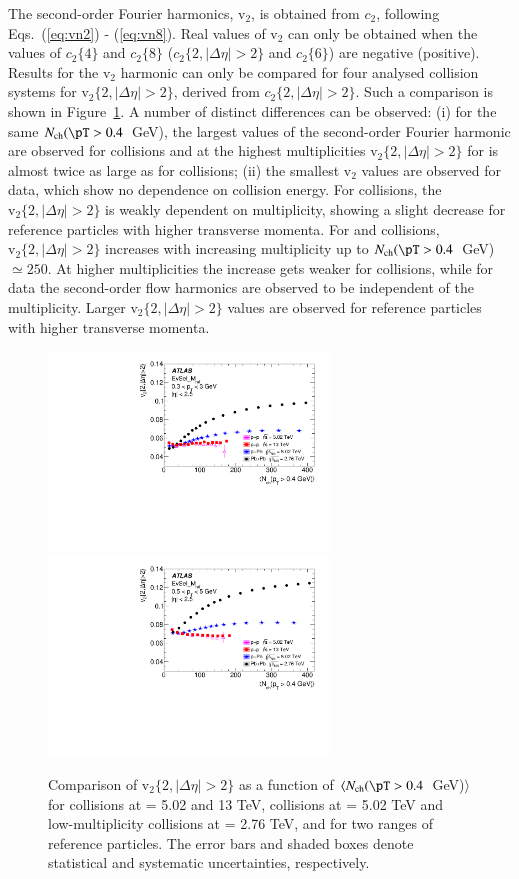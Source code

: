 \documentclass[cernpreprint,texlive=2014,txfonts,UKenglish]{latex/atlasdoc}
\renewcommand{\eqref}[1]{\textup{{\normalfont(\ref{#1}}\normalfont)}}
\begin{document}
The second-order Fourier harmonics, $\mathrm{v}_2$, is obtained from $c_2$, following Eqs.~\eqref{eq:vn2} - \eqref{eq:vn8}. Real values of $\mathrm{v}_2$ can only be obtained when the values of $c_2\{4\}$ and $c_2\{8\}$ ($c_2\{2,|\Delta\eta|>2\}$ and $c_2\{6\}$) are negative (positive). 
Results for the $\mathrm{v}_2$ harmonic can only be compared for four analysed collision systems for $\mathrm{v}_2\{2,|\Delta\eta| > 2\}$, derived from $c_2\{2,|\Delta\eta| > 2\}$. Such a comparison is shown in Figure~\ref{fig:Allv22gap}.  A number of distinct differences can be observed: (i) for the same $N_{\mathrm{ch}}(\pT > 0.4$~GeV), the largest values of the second-order Fourier harmonic are observed for \PbPb collisions and at the highest multiplicities $\mathrm{v}_2\{2,|\Delta\eta| > 2\}$ for \PbPb is almost twice as large as for \pPb collisions; (ii) the smallest $\mathrm{v}_2$ values are observed for \pp data, which show no dependence on collision energy. For \pp collisions,  the $\mathrm{v}_2\{2,|\Delta\eta| > 2\}$ is weakly dependent on multiplicity, showing a slight decrease for reference particles with higher transverse momenta.  For \pPb and \PbPb collisions, $\mathrm{v}_2\{2,|\Delta\eta| > 2\}$ increases with increasing multiplicity up to $N_{\mathrm{ch}}(\pT > 0.4$~GeV) $\simeq 250$. At higher multiplicities the increase gets weaker for \PbPb collisions, while for \pPb data the second-order flow harmonics are observed to be independent of the multiplicity. Larger $\mathrm{v}_2\{2,|\Delta\eta| > 2\}$ values are observed for reference particles with higher transverse momenta. 
\begin{figure}[ht!]
\begin{center}
\includegraphics[width=75mm]{fig_09a.pdf}
\includegraphics[width=75mm]{fig_09b.pdf}
\caption{Comparison of $\mathrm{v}_2\{2,|\Delta\eta| > 2\}$ as a function of $\langle N_{\mathrm{ch}}(\pT > 0.4$~GeV)$\rangle$ for \pp collisions at \sqs= 5.02 and 13 TeV, \pPb collisions at \sqn= 5.02 TeV and low-multiplicity \PbPb collisions at \sqn= 2.76 TeV, and for two \pT ranges of reference particles. The error bars and shaded boxes denote statistical and systematic uncertainties, respectively.}
\label{fig:Allv22gap} 
\end{center}
\end{figure}
\end{document}
